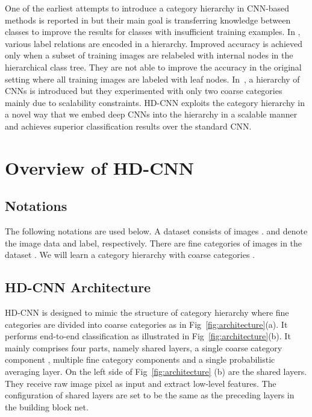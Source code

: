 \documentclass[10pt,twocolumn,letterpaper]{article}
\begin{document}
One of the earliest attempts to introduce a category hierarchy in CNN-based methods is reported in \cite{srivastava2013discriminative} but their main goal is transferring knowledge between classes to improve the results for classes with insufficient training examples. In \cite{deng2014large}, various label relations are encoded in a hierarchy. Improved accuracy is achieved only when a subset of training images are relabeled with internal nodes in the hierarchical class tree. They are not able to improve the accuracy in the original setting where all training images are labeled with leaf nodes. In~\cite{xiao2014error}, a hierarchy of CNNs is introduced but they experimented with only two coarse categories mainly due to scalability constraints. HD-CNN exploits the category hierarchy in a novel way that we embed deep CNNs into the hierarchy in a scalable manner and achieves superior classification results over the standard CNN.















\section{Overview of HD-CNN}
\label{sec:overview}

\subsection{Notations}
The following notations are used below. A dataset consists of images .  and  denote the image data and label, respectively. There are  fine categories of images in the dataset . We will learn a category hierarchy with  coarse categories .

\subsection{HD-CNN Architecture}

HD-CNN is designed to mimic the structure of category hierarchy where fine categories are divided into coarse categories as in Fig~\ref{fig:architecture}(a). It performs end-to-end classification as illustrated in Fig~\ref{fig:architecture}(b). It mainly comprises four parts, namely shared layers, a single coarse category component , multiple fine category components  and a single probabilistic averaging layer. On the left side of Fig~\ref{fig:architecture} (b) are the shared layers. They receive raw image pixel as input and extract low-level features. The configuration of shared layers are set to be the same as the preceding layers in the building block net.
\end{document}
